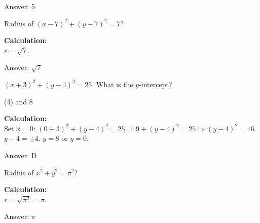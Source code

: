 \documentclass[11pt,paper=a4,answers]{exam}
\begin{document}
\begin{questions}
\begin{solution}
\vspace{30pt}

Answer: \colorbox{yellow!100}{5}
\end{solution}

\vspace{60pt}

\question
Radius of $(x-7)^2 + (y-7)^2 = 7$?

\begin{solution}
\textbf{Calculation:} \\
$r = \sqrt{7}$.

\vspace{30pt}

Answer: \colorbox{yellow!100}{$\sqrt{7}$}
\end{solution}

\vspace{60pt}

\question
$(x+3)^2 + (y-4)^2 = 25$. What is the $y$-intercept?
\begin{tasks}(4)
     and 8
\end{tasks}

\begin{solution}
\textbf{Calculation:} \\
Set $x=0$: $(0+3)^2 + (y-4)^2 = 25 \Rightarrow 9 + (y-4)^2 = 25 \Rightarrow (y-4)^2 = 16$. $y-4 = \pm 4$. $y=8$ or $y=0$.

\vspace{30pt}

Answer: \colorbox{yellow!100}{D}
\end{solution}

\vspace{60pt}

\question
Radius of $x^2 + y^2 = \pi^2$?

\begin{solution}
\textbf{Calculation:} \\
$r = \sqrt{\pi^2} = \pi$.

\vspace{30pt}

Answer: \colorbox{yellow!100}{$\pi$}
\end{solution}

\vspace{60pt}


\end{questions}
\end{document}
